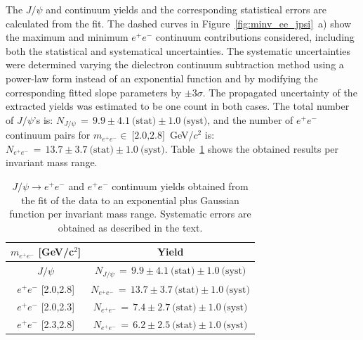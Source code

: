 \documentclass[dvipdfm]{elsart}
\def\tab#1{{Table~\ref{#1}}}
\def\fig#1{{Figure~\ref{#1}}}
\providecommand{\jpsi}{J/\psi}
\begin{document}
The $\jpsi$ and continuum yields and the corresponding statistical errors are 
calculated from the fit. The dashed curves in \fig{fig:minv_ee_jpsi}~a) show 
the maximum and minimum $e^+e^-$ continuum contributions considered, 
including both the statistical and systematical uncertainties. The systematic 
uncertainties were determined varying the dielectron continuum subtraction 
method using a power-law form instead of an exponential function and by 
modifying the corresponding fitted slope parameters by $\pm 3 \sigma$. The 
propagated uncertainty of the extracted yields was estimated to be one count 
in both cases. The total number of $\jpsi$'s is: $N_{\jpsi} \,=\, 9.9 \pm 
4.1~\mbox{(stat)} \pm 1.0~\mbox{(syst)}$, and the number of $e^+ e^-$ 
continuum pairs for $m_{e^+e^-}\in~\mbox{[2.0,2.8]}$~GeV/$c^2$ is: $N_{e^+ 
e^-} \,=\, 13.7 \pm 3.7~\mbox{(stat)} \pm 1.0~\mbox{(syst)}$. 
\tab{tab:yields} shows the obtained results per invariant mass range.

\begin{table}[tb]
  \caption{
    \label{tab:yields}
    $\jpsi \rightarrow e^+e^-$ and $e^+e^-$ continuum yields obtained
    from the fit of the data to an exponential plus Gaussian function per
    invariant mass range. Systematic errors are obtained as described in the text.
  }
  \begin{center}
    \begin{tabular}{cc}
      \noalign{\smallskip} \hline\hline 
      $m_{e^+e^-}$ [GeV/c$^2$] & Yield
      \\  \hline\hline 
      $\jpsi$ & $N_{\jpsi} \,=\, 9.9 \pm 4.1~\mbox{(stat)} \pm 1.0~\mbox{(syst)}$
      \\
      $e^+e^- $ \mbox{[2.0,2.8]} & $N_{e^+ e^-} \,=\, 13.7 \pm 3.7~\mbox{(stat)} \pm 1.0~\mbox{(syst)}$
      \\
      $e^+e^- $ \mbox{[2.0,2.3]} & $N_{e^+ e^-} \,=\, 7.4 \pm 2.7~\mbox{(stat)} \pm 1.0~\mbox{(syst)}$
      \\
      $e^+e^- $ \mbox{[2.3,2.8]} & $N_{e^+ e^-} \,=\, 6.2 \pm 2.5~\mbox{(stat)} \pm 1.0~\mbox{(syst)}$
      \\  \hline\hline 
    \end{tabular}
  \end{center}
\end{table}
\end{document}
